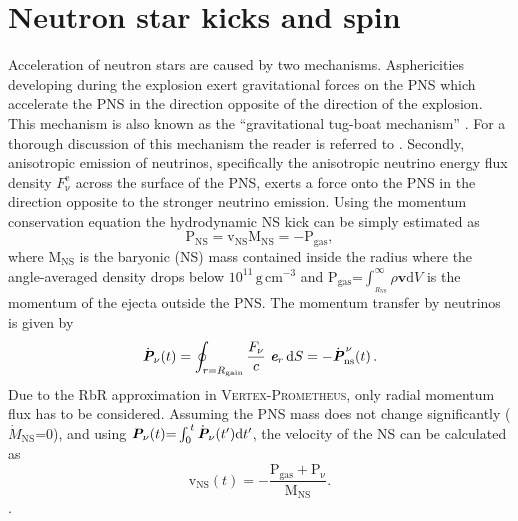 \documentclass[fleqn,usenatbib]{mnras}
\newcommand{\ud}{\ensuremath{\mathrm{d}}\xspace}
\newcommand{\gcc}{\text{g}\, \text{cm}^{-3}}
\newcommand{\vertexprom}{\textsc{Vertex-Prometheus}\xspace}
\begin{document}

\section{Neutron star kicks and spin}
\label{Appendix:Neutron Star Properties}
Acceleration of neutron stars are caused by two mechanisms. 
Asphericities developing during the explosion exert gravitational forces on the PNS which accelerate the PNS in the direction opposite of the direction of the explosion. This mechanism is also known as the ``gravitational tug-boat mechanism'' \citep{Wongwathanarat2013}. For a thorough discussion of this mechanism the reader is referred to \citet{Scheck2006,Wongwathanarat2013,Janka2017,Gessner2018,Mueller2019}.
Secondly, anisotropic emission of neutrinos, specifically the anisotropic neutrino energy flux density $F_{\mathrm{\nu}}^{\mathrm{e}}$ across the surface of the PNS, exerts a force onto the PNS in the direction opposite to the stronger neutrino emission.
Using the momentum conservation equation the hydrodynamic NS kick can be simply estimated as
\begin{equation}
  \pmb{\mathrm{P}}_{\mathrm{NS}} = \pmb{\mathrm{v}}_{\mathrm{NS}}\mathrm{M_{NS}} = -\pmb{\mathrm{P}}_{\mathrm{gas}},
\end{equation}
where $\mathrm{M_{NS}}$ is the baryonic (NS) mass contained inside the radius where the angle-averaged density drops below $10^{11}\, \gcc$ and $\pmb{\mathrm{P}}_{\mathrm{gas}}\mathord{=}\int_{_{R_{\mathrm{NS}}}}^{\infty} \rho\pmb{v}\ud V$ is the momentum of the ejecta outside the PNS.
The momentum transfer by neutrinos is given by
\begin{equation}
    \label{equ:nukick}
    \dot{\textit{\textbf{P}}}_{\nu} (t) = \oint_{r = R_\mathrm{gain}}
    \frac{F_{\nu}}{c}\ \textit{\textbf{e}}_r \, \ud S
    = - \dot{\textit{\textbf{P}}}_\mathrm{ns}^{\,\nu} (t) \,.
\end{equation}
Due to the RbR approximation in \vertexprom, only radial momentum flux has
to be considered.
Assuming the PNS mass does not change significantly ($\dot{M}_{\mathrm{NS}}\mathord{=}0$), and using $\textit{\textbf{P}}_\nu (t)\mathord{=}\int_0^{\, t} \dot{\textit{\textbf{P}}}_{\nu} 
(t')\mathrm{d}t'$, the velocity of the NS can be calculated as
\begin{equation}
  \pmb{\mathrm{v}}_{\mathrm{NS}}(t) = - \frac{\pmb{\mathrm{P}}_{\mathrm{gas}} + \pmb{\mathrm{P}}_{\mathrm{\nu}}}{ \mathrm{M_{NS}}}.
  \label{equ:momentum_kick}
\end{equation}.
\end{document}
